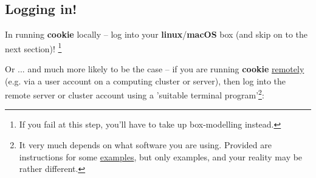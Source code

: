 \subsection{Logging in!}

In running \textbf{cookie} locally -- log into your \textbf{linux}/\textbf{macOS} box (and skip on to the next section)! \footnote{If you fail at this step, you'll have to take up box-modelling instead.}

\noindent Or ... and much more likely to be the case -- if you are running \textbf{cookie} \uline{remotely} (e.g. via a user account on a computing cluster or server), then log into the remote server or cluster account using a 'suitable terminal program'\footnote{It very much depends on what software you are using. Provided are instructions for some \uline{examples}, but only examples, and your reality may be rather different.}:

